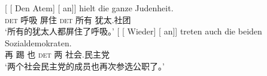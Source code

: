 \begin{exe}
\begin{xlist}[iv.]
\begin{exe}
\begin{xlist}[iv.]
\eal
\label{ex-complex-vf}
\ex
\gll {}[ [ Den Atem]  [ an]] hielt die ganze Judenheit.\footnotemark\\
       {}        {}        \textsc{det} 呼吸 {}    \partic{}  屏住  \textsc{det} 所有 犹太.社团\\
\glt `所有的犹太人都屏住了呼吸。'
\ex\label{bsp-wieder-an-tritt-zwei}
\gll {}[ [ Wieder] [ an]] treten auch die beiden Sozialdemokraten.\footnotemark\\
      {}         {}        再   {}        \partic{} 踢 也 \textsc{det} 两 社会.民主党\\
\glt `两个社会民主党的成员也再次参选公职了。' %


\end{xlist}
\end{exe}
\end{xlist}
\end{exe}

